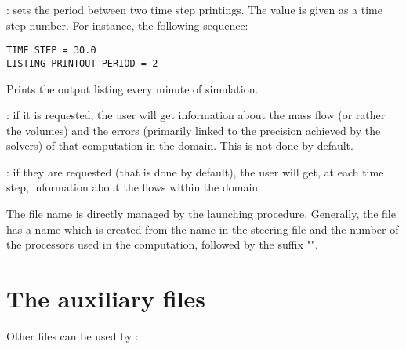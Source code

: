 : sets the period between two time step
printings. The value is given as a time step number. For instance, the
following sequence:

\begin{lstlisting}[language=TelemacCas]
TIME STEP = 30.0
LISTING PRINTOUT PERIOD = 2
\end{lstlisting}

Prints the output listing every minute of simulation.

: if it is requested, the user will get
information about the mass flow (or rather the volumes) and the errors
(primarily linked to the precision achieved by the solvers) of that computation
in the domain. This is not done by default.

: if they are
requested (that is done by default), the user will get, at each time step,
information about the flows within the domain.

The file name is directly managed by the  launching procedure.
Generally, the file has a name which is created from the name in the steering
file and the number of the processors used in the computation, followed by the
suffix "".

%
%
%
\section{The auxiliary files}

Other files can be used by :


